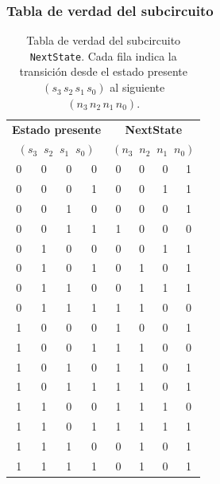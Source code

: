 \documentclass[12pt]{article}
\begin{document}
\subsubsection{Tabla de verdad del subcircuito}
\begin{table}[H]
  \centering
  \begin{tabular}{cccc|cccc}
    \multicolumn{4}{c|}{\bf Estado presente} & \multicolumn{4}{c}{\bf NextState}\\
    \multicolumn{4}{c|}{\((s_{3}\;\;s_{2}\;\;s_{1}\;\;s_{0})\)} & \multicolumn{4}{c}{\((n_{3}\;\;n_{2}\;\;n_{1}\;\;n_{0})\)}\\
    \hline
    0 & 0 & 0 & 0 & 0 & 0 & 0 & 1 \\ %
    0 & 0 & 0 & 1 & 0 & 0 & 1 & 1 \\ %
    0 & 0 & 1 & 0 & 0 & 0 & 0 & 1 \\ %
    0 & 0 & 1 & 1 & 1 & 0 & 0 & 0 \\ %
    0 & 1 & 0 & 0 & 0 & 0 & 1 & 1 \\ %
    0 & 1 & 0 & 1 & 0 & 1 & 0 & 1 \\ %
    0 & 1 & 1 & 0 & 0 & 1 & 1 & 1 \\ %
    0 & 1 & 1 & 1 & 1 & 1 & 0 & 0 \\ %
    1 & 0 & 0 & 0 & 1 & 0 & 0 & 1 \\ %
    1 & 0 & 0 & 1 & 1 & 1 & 0 & 0 \\ %
    1 & 0 & 1 & 0 & 1 & 1 & 0 & 1 \\ %
    1 & 0 & 1 & 1 & 1 & 1 & 0 & 1 \\ %
    1 & 1 & 0 & 0 & 1 & 1 & 1 & 0 \\ %
    1 & 1 & 0 & 1 & 1 & 1 & 1 & 1 \\ %
    1 & 1 & 1 & 0 & 0 & 1 & 0 & 1 \\ %
    1 & 1 & 1 & 1 & 0 & 1 & 0 & 1 \\ %
  \end{tabular}
  \caption{Tabla de verdad del subcircuito \texttt{NextState}. Cada fila indica la transición  
    desde el estado presente \((s_{3}\,s_{2}\,s_{1}\,s_{0})\) al siguiente \((n_{3}\,n_{2}\,n_{1}\,n_{0})\).}
\end{table}

\bigskip

\end{document}
